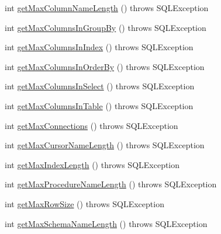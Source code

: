 \begin{DoxyCompactItemize}
\item 
int \mbox{\hyperlink{classcom_1_1mysql_1_1cj_1_1jdbc_1_1_database_meta_data_a723662c0e2facd127edb178a26972daf}{get\+Max\+Column\+Name\+Length}} ()  throws S\+Q\+L\+Exception 
\item 
int \mbox{\hyperlink{classcom_1_1mysql_1_1cj_1_1jdbc_1_1_database_meta_data_ae18e4f3a48a9a4d1582f1fa25cb38527}{get\+Max\+Columns\+In\+Group\+By}} ()  throws S\+Q\+L\+Exception 
\item 
int \mbox{\hyperlink{classcom_1_1mysql_1_1cj_1_1jdbc_1_1_database_meta_data_a2876875ffdff9b0958a67a9df4e6c3d4}{get\+Max\+Columns\+In\+Index}} ()  throws S\+Q\+L\+Exception 
\item 
int \mbox{\hyperlink{classcom_1_1mysql_1_1cj_1_1jdbc_1_1_database_meta_data_a36493a3ec90362550c8073060f09975e}{get\+Max\+Columns\+In\+Order\+By}} ()  throws S\+Q\+L\+Exception 
\item 
int \mbox{\hyperlink{classcom_1_1mysql_1_1cj_1_1jdbc_1_1_database_meta_data_ab59408daad0419ca46b30d530d1698f1}{get\+Max\+Columns\+In\+Select}} ()  throws S\+Q\+L\+Exception 
\item 
int \mbox{\hyperlink{classcom_1_1mysql_1_1cj_1_1jdbc_1_1_database_meta_data_ac8a4df2879a73abc6b4f67597e4e1889}{get\+Max\+Columns\+In\+Table}} ()  throws S\+Q\+L\+Exception 
\item 
int \mbox{\hyperlink{classcom_1_1mysql_1_1cj_1_1jdbc_1_1_database_meta_data_a32625ff8d735d95f5504d6a6a0650b3a}{get\+Max\+Connections}} ()  throws S\+Q\+L\+Exception 
\item 
int \mbox{\hyperlink{classcom_1_1mysql_1_1cj_1_1jdbc_1_1_database_meta_data_a2b6f44e542d7d900cd2f7176bdeee045}{get\+Max\+Cursor\+Name\+Length}} ()  throws S\+Q\+L\+Exception 
\item 
int \mbox{\hyperlink{classcom_1_1mysql_1_1cj_1_1jdbc_1_1_database_meta_data_a2a51a83e52633c6ec15442648af0cf12}{get\+Max\+Index\+Length}} ()  throws S\+Q\+L\+Exception 
\item 
int \mbox{\hyperlink{classcom_1_1mysql_1_1cj_1_1jdbc_1_1_database_meta_data_a298c4827786b7801d1bc85a37c643a3b}{get\+Max\+Procedure\+Name\+Length}} ()  throws S\+Q\+L\+Exception 
\item 
int \mbox{\hyperlink{classcom_1_1mysql_1_1cj_1_1jdbc_1_1_database_meta_data_ad4f6654c296ca5239cbe62b036363df3}{get\+Max\+Row\+Size}} ()  throws S\+Q\+L\+Exception 
\item 
int \mbox{\hyperlink{classcom_1_1mysql_1_1cj_1_1jdbc_1_1_database_meta_data_a5173b480262679925fc705e1efd9b7f2}{get\+Max\+Schema\+Name\+Length}} ()  throws S\+Q\+L\+Exception 

\end{DoxyCompactItemize}
